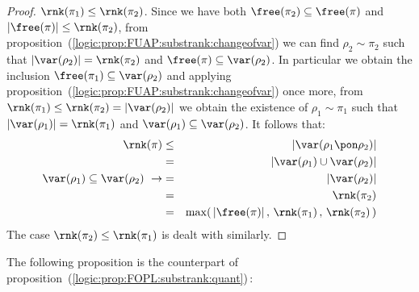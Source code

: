 \begin{proof}
$\rnk(\pi_{1})\leq\rnk(\pi_{2})$. Since we have both
$\free(\pi_{2})\subseteq\free(\pi)$ and
$|\free(\pi)|\leq\rnk(\pi_{2})$, from
proposition~(\ref{logic:prop:FUAP:substrank:changeofvar}) we can
find $\rho_{2}\sim\pi_{2}$ such that
$|\var(\rho_{2})|=\rnk(\pi_{2})$ and
$\free(\pi)\subseteq\var(\rho_{2})$. In particular we obtain the
inclusion $\free(\pi_{1})\subseteq\var(\rho_{2})$ and applying
proposition~(\ref{logic:prop:FUAP:substrank:changeofvar}) once more,
from  $\rnk(\pi_{1})\leq\rnk(\pi_{2})=|\var(\rho_{2})|$ we obtain
the existence of $\rho_{1}\sim\pi_{1}$ such that
$|\var(\rho_{1})|=\rnk(\pi_{1})$ and
$\var(\rho_{1})\subseteq\var(\rho_{2})$. It follows that:
    \begin{eqnarray*}
    \rnk(\pi)&\leq&|\var(\rho_{1}\pon\rho_{2})|\\
    &=&|\var(\rho_{1})\cup\var(\rho_{2})|\\
    \var(\rho_{1})\subseteq\var(\rho_{2})\ \rightarrow&=&|\var(\rho_{2})|\\
    &=&\rnk(\pi_{2})\\
    &=&\max(\,|\free(\pi)|\,,\,\rnk(\pi_{1})\,,\,\rnk(\pi_{2})\,)
    \end{eqnarray*}
The case $\rnk(\pi_{2})\leq\rnk(\pi_{1})$ is dealt with similarly.
\end{proof}

The following proposition is the counterpart of
proposition~(\ref{logic:prop:FOPL:substrank:quant})\,:


